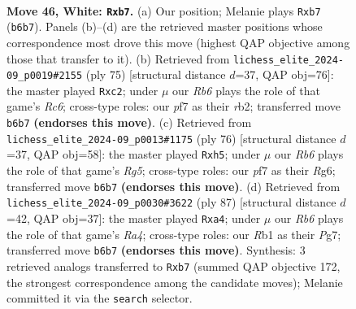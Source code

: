 \documentclass[11pt]{article}
\begin{document}
\clearpage

\begin{figure}[p]\centering
\begin{subfigure}{0.46\textwidth}\centering
\resizebox{\linewidth}{!}{%
\newchessgame
\chessboard[
  setfen={8/1p3p2/pR2pk2/8/P3P2K/5P1P/6rP/1R6 w - - 21 46},
  showmover=false,
  pgfstyle=straightmove, color=movearrow, markmove={b6-b7}
]}
\caption{}
\end{subfigure}\hfill
\begin{subfigure}{0.46\textwidth}\centering
\resizebox{\linewidth}{!}{%
\newchessgame
\chessboard[
  setfen={2r5/5R1p/p5pk/P7/5p2/2rP1K1P/1RP5/8 b - - 4 38},
  showmover=false,
  pgfstyle=straightmove, color=movearrow, markmove={c3-c2}
]}
\caption{}
\end{subfigure}
\\[4pt]
\begin{subfigure}{0.46\textwidth}\centering
\resizebox{\linewidth}{!}{%
\newchessgame
\chessboard[
  setfen={8/p7/1p4R1/4kpRp/1KP1r2P/5r2/PP6/8 w - - 1 39},
  showmover=false,
  pgfstyle=straightmove, color=movearrow, markmove={g5-h5}
]}
\caption{}
\end{subfigure}\hfill
\begin{subfigure}{0.46\textwidth}\centering
\resizebox{\linewidth}{!}{%
\newchessgame
\chessboard[
  setfen={4R3/p1k2rp1/2p4p/r7/P1P1p2P/6P1/5P2/4RK2 b - - 3 44},
  showmover=false,
  pgfstyle=straightmove, color=movearrow, markmove={a5-a4}
]}
\caption{}
\end{subfigure}
\caption{\textbf{Move 46, White: \texttt{Rxb7}.} (a) Our position; Melanie plays \texttt{Rxb7} (\texttt{b6b7}). Panels (b)--(d) are the retrieved master positions whose correspondence most drove this move (highest QAP objective among those that transfer to it). (b) Retrieved from \texttt{lichess\_elite\_2024-09\_p0019\#2155} (ply 75) [structural distance $d$=37, QAP obj=76]: the master played \texttt{Rxc2}; under $\mu$ our \emph{Rb6} plays the role of that game's \emph{Rc6}; cross-type roles: our \emph{p}f7 as their \emph{r}b2; transferred move \texttt{b6b7} \textbf{(endorses this move)}. (c) Retrieved from \texttt{lichess\_elite\_2024-09\_p0013\#1175} (ply 76) [structural distance $d$=37, QAP obj=58]: the master played \texttt{Rxh5}; under $\mu$ our \emph{Rb6} plays the role of that game's \emph{Rg5}; cross-type roles: our \emph{p}f7 as their \emph{R}g6; transferred move \texttt{b6b7} \textbf{(endorses this move)}. (d) Retrieved from \texttt{lichess\_elite\_2024-09\_p0030\#3622} (ply 87) [structural distance $d$=42, QAP obj=37]: the master played \texttt{Rxa4}; under $\mu$ our \emph{Rb6} plays the role of that game's \emph{Ra4}; cross-type roles: our \emph{R}b1 as their \emph{P}g7; transferred move \texttt{b6b7} \textbf{(endorses this move)}. Synthesis: 3 retrieved analogs transferred to \texttt{Rxb7} (summed QAP objective 172, the strongest correspondence among the candidate moves); Melanie committed it via the \texttt{search} selector.}
\label{fig:thought-m90}
\end{figure}
\end{document}
